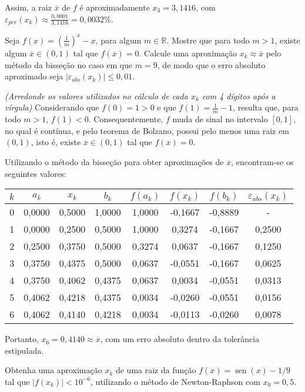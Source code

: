 \documentclass[12pt,a4paper]{article}
\newcommand*\sen{\operatorname{sen}}
\newcommand*\R{\mathbb{R}}
\begin{document}
\begin{ExerciseList}
Assim, a raiz $\overline{x}$ de $f$ é aproximadamente $x_3 = 3,1416$, com $\varepsilon_{per}(x_k) \approx \frac{0,0001}{3,1416} = 0,0032\%$.

\Exercise[title={2,5}]
Seja $f(x) = \left(\frac{1}{m}\right)^x - x$, para algum $m \in \R$. Mostre que para todo $m > 1$, existe algum $\overline{x} \in (0, 1)$ tal que $f(\overline{x}) = 0$. Calcule uma aproximação $x_k \approx \overline{x}$ pelo método da bisseção no caso em que $m = 9$, de modo que o erro absoluto aproximado seja $|\varepsilon_{abs}(x_k)| \leq 0,01$.

\textit{(Arredonde os valores utilizados no cálculo de cada $x_k$ com 4 dígitos após a vírgula)}
\Answer Considerando que $f(0) = 1 > 0$ e que $f(1) = \frac{1}{m}-1$, resulta que, para todo $m > 1$, $f(1) < 0$. Consequentemente, $f$ muda de sinal no intervalo $[0,1]$, no qual é contínua, e pelo teorema de Bolzano, possui pelo menos uma raiz em $(0,1)$, isto é, existe $\overline{x} \in (0,1)$ tal que $f(\overline{x}) = 0$.

Utilizando o método da bisseção para obter aproximações de $\overline{x}$, encontram-se os seguintes valores:

\begin{center}
\begin{tabular}{cccccccc}
\hline 
$k$ & $a_k$ & $x_k$ & $b_k$ & $f(a_k)$ & $f(x_k)$ & $f(b_k)$ & $\varepsilon_{abs}(x_k)$\\\hline
0 & 0,0000 & 0,5000 & 1,0000 & 1,0000 & -0,1667 & -0,8889 & -\\
1 & 0,0000 & 0,2500 & 0,5000 & 1,0000 & 0,3274 & -0,1667 & 0,2500\\
2 & 0,2500 & 0,3750 & 0,5000 & 0,3274 & 0,0637 & -0,1667 & 0,1250\\
3 & 0,3750 & 0,4375 & 0,5000 & 0,0637 & -0,0551 & -0,1667 & 0,0625\\
4 & 0,3750 & 0,4062 & 0,4375 & 0,0637 & 0,0034 & -0,0551 & 0,0313\\
5 & 0,4062 & 0,4218 & 0,4375 & 0,0034 & -0,0260 & -0,0551 & 0,0156\\
6 & 0,4062 & 0,4140 & 0,4218 & 0,0034 & -0,0113 & -0,0260 & 0,0078\\\hline
\end{tabular}
\end{center}
Portanto, $x_6 = 0,4140 \approx \overline{x}$, com um erro absoluto dentro da tolerância estipulada.

\Exercise[title={2,5}]
Obtenha uma aproximação $x_k$ de uma raiz da função $f(x) = \sen(x)-1/9$ tal que $|f(x_k)| < 10^{-6}$, utilizando o método de Newton-Raphson com $x_0 = 0,5$.


\end{ExerciseList}
\end{document}
